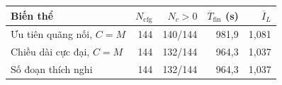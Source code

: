 \begin{tabular}{@{}lrrrr@{}}
\toprule
Biến thể & $N_{\mathrm{cfg}}$ & $N_c>0$ & $\overline T_{\mathrm{fin}}$ (s) & $\overline I_L$ \\
\midrule
Ưu tiên quãng nối, $C=M$ & 144 & 140/144 & 981{,}9 & 1{,}081 \\
Chiều dài cực đại, $C=M$ & 144 & 132/144 & 964{,}3 & 1{,}037 \\
Số đoạn thích nghi & 144 & 132/144 & 964{,}3 & 1{,}037 \\
\bottomrule
\end{tabular}
